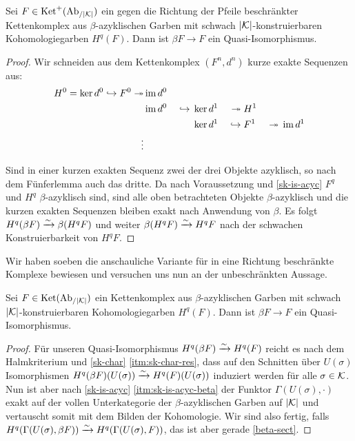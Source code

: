 \begin{prop}
  Sei $F \in \operatorname{Ket}^+(\operatorname{Ab}_{/|\mathcal{K}|})$ ein gegen die Richtung der Pfeile
  beschränkter Kettenkomplex aus $\beta$-azy\-klischen Garben mit
  schwach $|\mathcal{K}|$-kon\-stru\-ier\-bar\-en Kohomologiegarben $H^q(F)$. Dann
  ist $\beta F \to F$ ein Quasi-Iso\-mor\-phis\-mus.
\end{prop}
\begin{proof}
  Wir schneiden aus dem Kettenkomplex $(F^n, d^n)$ kurze exakte
  Sequenzen aus:
  \begin{alignat*}{4}
    H^0 = \ker d^0 \hookrightarrow F^0 \twoheadrightarrow &\operatorname{im} d^0 & & \\
    &\operatorname{im} d^0& {} \hookrightarrow {} &\ker d^1& {}\twoheadrightarrow {} &H^1& \\
    && &\ker d^1& {} \hookrightarrow {} &F^1& {} \twoheadrightarrow {} \operatorname{im} d^1 \\
    \vdots
  \end{alignat*}
  
  Sind in einer kurzen exakten Sequenz zwei der drei Objekte
  azyklisch, so nach dem Fünferlemma auch das dritte. Da nach
  Voraussetzung und \ref{sk-is-acyc} $F^q$ und $H^q$
  $\beta$-azyklisch sind, sind alle oben betrachteten Objekte
  $\beta$-azyklisch und die kurzen exakten Sequenzen bleiben exakt
  nach Anwendung von $\beta$. Es folgt $H^q(\beta F) \xrightarrow{\sim} \beta (H^q
  F)$ und weiter $\beta (H^q F) \xrightarrow{\sim} H^q F$ nach der schwachen
  Konstruierbarkeit von $H^q F$.
\end{proof}

Wir haben soeben die anschauliche Variante für in eine Richtung
beschränkte Komplexe bewiesen und versuchen uns nun an der
unbeschränkten Aussage.

\begin{satz} \label{beta-qi}
  Sei $F \in \operatorname{Ket}(\operatorname{Ab}_{/|\mathcal{K}|})$ ein Kettenkomplex aus $\beta$-azy\-klischen
  Garben mit schwach $|\mathcal{K}|$-kon\-stru\-ier\-bar\-en Kohomologiegarben
  $H^q(F)$. Dann ist $\beta F \to F$ ein Quasi-Iso\-mor\-phis\-mus.
\end{satz}
\begin{proof}

  
  Für unseren Quasi-Isomorphismus $H^q(\beta F) \xrightarrow{\sim} H^q(F)$ reicht es
  nach dem Halmkriterium und \ref{sk-char} \ref{itm:sk-char-res}, dass
  auf den Schnitten über $U(\sigma)$ Isomorphismen $H^q(\beta
  F)(U(\sigma)) \xrightarrow{\sim} H^q(F)(U(\sigma))$ induziert werden für alle
  $\sigma \in \mathcal{K}$. Nun ist aber nach \ref{sk-is-acyc}
  \ref{itm:sk-is-acyc-beta} der Funktor $\Gamma(U(\sigma), \cdot)$
  exakt auf der vollen Unterkategorie der $\beta$-azyklischen Garben
  auf $|\mathcal{K}|$ und vertauscht somit mit dem Bilden der Kohomologie. Wir
  sind also fertig, falls $H^q(\Gamma(U(\sigma), \beta F)) \xrightarrow{\sim}
  H^q(\Gamma(U(\sigma), F))$, das ist aber gerade \ref{beta-sect}.
\end{proof}

